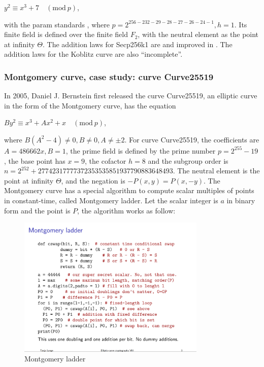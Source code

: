 \begin{center}
  $y^2 \equiv x^3 + 7 \quad (\text{mod} \ p)$,
\end{center}

with the param standards \cite{secp256k1}, where $p = 2^{256 - 232 - 29 - 28 - 27 - 26 - 24 - 1}, h = 1$. Its finite field is defined over the finite field $F_2$, with the neutral element as the point at infinity $\Theta$. The addition laws for Secp256k1 are \cite{KoblitzAdditionLaw} and improved in \cite{KoblitzCryptosystem}. The addition laws for the Koblitz curve are also “incomplete”.

\subsubsection{Montgomery curve, case study: curve Curve25519}
In 2005, Daniel J. Bernstein first released the curve Curve25519, an elliptic curve in the form of the Montgomery curve, has the equation

\begin{center}
  $By^2 \equiv x^3 + Ax^2 + x \quad (\text{mod} \ p)$,
\end{center}

where $B(A^2-4) \neq 0, B \neq 0, A \neq \pm 2$. For curve Curve25519, the coefficients are $A = 486662x, B = 1$, the prime field is defined by the prime number $p=2^{255}-19$, the base point has $x = 9$,  the cofactor $h = 8$ and the subgroup order is $n = 2^{252} + 27742317777372353535851937790883648493$. The neutral element is the point at infinity $\Theta$, and the negation is $-P(x, y) = P(x, -y)$. The Montgomery curve has a special algorithm to compute scalar multiples of points in constant-time, called Montgomery ladder. Let the scalar integer is $a$ in binary form and the point is $P$, the algorithm works as follow:

\begin{figure}[ht!]
  \centering
  \includegraphics[width=0.8\textwidth]{images/montgomery_ladder.png}
  \caption[Montgomery ladder]{Montgomery ladder}
  \label{fig:montgomery_ladder}
\end{figure}

